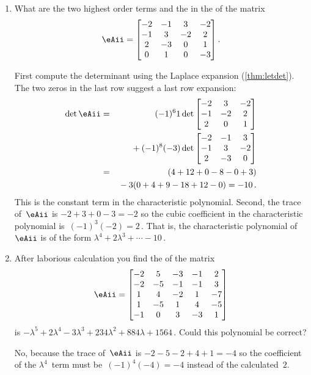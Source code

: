 \begin{example} \label{eg:}
\begin{enumerate}
\item What are the two highest order terms and the  in the  of the matrix
\begin{equation*}
\eAii=\begin{bmatrix}-2&-1&3&-2
\\-1&3&-2&2
\\2&-3&0&1
\\0&1&0&-3  \end{bmatrix}.
\end{equation*}
\begin{solution} 
First compute the determinant using the Laplace expansion (\autoref{thm:letdet}).  
The two zeros in the last row suggest a last row expansion:
\begin{eqnarray*}
\det \eAii&=&(-1)^61\det\begin{bmatrix}-2&3&-2
\\-1&-2&2
\\2&0&1 \end{bmatrix}
\\&&{}
+(-1)^8(-3)\det\begin{bmatrix}-2&-1&3
\\-1&3&-2
\\2&-3&0\end{bmatrix}
\\&=&(4+12+0-8-0+3)
\\&&{}-3(0+4+9-18+12-0)
=-10\,.
\end{eqnarray*}
This is the constant term in the characteristic polynomial.
Second, the trace of~\(\eAii\) is \(-2+3+0-3=-2\) so the cubic coefficient in the characteristic polynomial is~\((-1)^3(-2)=2\)\,.
That is, the characteristic polynomial of~\(\eAii\) is of the form \(\lambda^4+2\lambda^3+\cdots-10\)\,.
\end{solution}

\item After laborious calculation you find the  of the matrix
\begin{equation*}
\eAii=\begin{bmatrix}-2&5&-3&-1&2
\\-2&-5&-1&-1&3
\\1&4&-2&1&-7
\\1&-5&1&4&-5
\\-1&0&3&-3&1\end{bmatrix}
\end{equation*}
is \(-\lambda^5+2\lambda^4-3\lambda^3+234\lambda^2+884\lambda+1564\)\,.  
Could this polynomial be correct?
\begin{solution} 
No, because the trace of~\(\eAii\) is \(-2-5-2+4+1=-4\) so the coefficient of the \(\lambda^4\)~term must be~\((-1)^4(-4)=-4\) instead of the calculated~\(2\).
\end{solution}


\end{enumerate}
\end{example}
